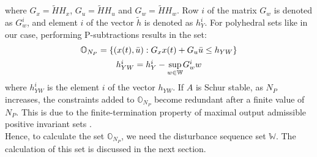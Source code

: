 \documentclass[letterpaper, 10 pt, conference]{ieeeconf}  %
\begin{document}
  where $G_x=\tilde{H}H_x$, $G_u=\tilde{H}H_u$ and $G_w=\tilde{H}H_w$.
  Row $i$ of the matrix $G_w$ is denoted as $G^i_w$, and element $i$ of the vector $\tilde{h}$ is denoted as $h_Y^i$.
   For polyhedral sets like in our case, performing P-subtractions results in the set:
  \begin{equation}
  \begin{matrix}
  \mathbb{O}_{N_P} = \{ (x(t),\bar{u}):G_xx(t)+G_u\bar{u}\leq h_{YW} \} \vspace{5pt} \\ 
  h_{YW}^i = h_Y^i-\underset{w\in \mathbb{W}}{\text{sup}} G_w^i w
  \end{matrix}
  \label{overall}
  \end{equation}
  where $h_{YW}^i$ is the element $i$ of the vector $h_{YW}$. If $A$ is Schur stable, as $N_P$ increases, the constraints added to $\mathbb{O}_{N_P}$ become redundant after a finite value of $N_P$. This is due to the finite-termination property of maximal output admissible positive invariant sets \cite{531239}.
  \\
Hence, to calculate the set $\mathbb{O}_{N_P}$, we need the disturbance sequence set $\mathbb{W}$. The calculation of this set is discussed in the next section.
\end{document}
